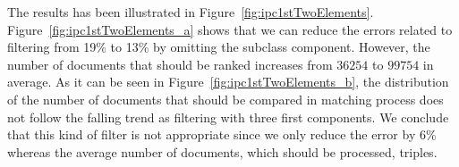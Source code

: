 The results has been illustrated in Figure~\ref{fig:ipc1stTwoElements}. Figure~\ref{fig:ipc1stTwoElements_a} shows that we can reduce the errors related to filtering from 19\% to 13\% by omitting the subclass component. However, the number of documents that should be ranked increases from $ 36254 $ to $ 99754 $ in average. As it can be seen in Figure~\ref{fig:ipc1stTwoElements_b}, the distribution of the number of documents that should be compared in matching process does not follow the falling trend as filtering with three first components. We conclude that this kind of filter is not appropriate since we only reduce the error by 6\% whereas the average number of documents, which should be processed, triples.    
